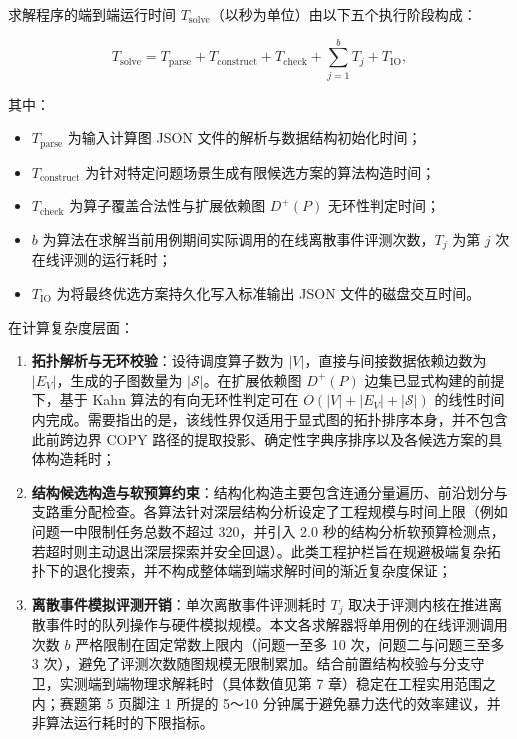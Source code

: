 \documentclass[anonymous,notoc]{gmcm2026}
\providecommand{\tightlist}{\setlength{\itemsep}{0pt}\setlength{\parskip}{0pt}}
\begin{document}
求解程序的端到端运行时间 \(T_{\mathrm{solve}}\)（以秒为单位）由以下五个执行阶段构成：

\begin{equation}
T_{\mathrm{solve}} = T_{\mathrm{parse}} + T_{\mathrm{construct}} + T_{\mathrm{check}} + \sum_{j=1}^{b} T_j + T_{\mathrm{IO}},
\end{equation}

其中：

\begin{itemize}
\tightlist
\item
  \(T_{\mathrm{parse}}\) 为输入计算图 JSON 文件的解析与数据结构初始化时间；
\item
  \(T_{\mathrm{construct}}\) 为针对特定问题场景生成有限候选方案的算法构造时间；
\item
  \(T_{\mathrm{check}}\) 为算子覆盖合法性与扩展依赖图 \(D^+(P)\) 无环性判定时间；
\item
  \(b\) 为算法在求解当前用例期间实际调用的在线离散事件评测次数，\(T_j\) 为第 \(j\) 次在线评测的运行耗时；
\item
  \(T_{\mathrm{IO}}\) 为将最终优选方案持久化写入标准输出 JSON 文件的磁盘交互时间。
\end{itemize}

在计算复杂度层面：

\begin{enumerate}
\def\labelenumi{\arabic{enumi}.}
\tightlist
\item
  \textbf{拓扑解析与无环校验}：设待调度算子数为 \(|V|\)，直接与间接数据依赖边数为 \(|E_V|\)，生成的子图数量为 \(|\mathcal{S}|\)。在扩展依赖图 \(D^+(P)\) 边集已显式构建的前提下，基于 Kahn 算法的有向无环性判定可在 \(O(|V| + |E_V| + |\mathcal{S}|)\) 的线性时间内完成。需要指出的是，该线性界仅适用于显式图的拓扑排序本身，并不包含此前跨边界 COPY 路径的提取投影、确定性字典序排序以及各候选方案的具体构造耗时；
\item
  \textbf{结构候选构造与软预算约束}：结构化构造主要包含连通分量遍历、前沿划分与支路重分配检查。各算法针对深层结构分析设定了工程规模与时间上限（例如问题一中限制任务总数不超过 320，并引入 2.0 秒的结构分析软预算检测点，若超时则主动退出深层探索并安全回退）。此类工程护栏旨在规避极端复杂拓扑下的退化搜索，并不构成整体端到端求解时间的渐近复杂度保证；
\item
  \textbf{离散事件模拟评测开销}：单次离散事件评测耗时 \(T_j\) 取决于评测内核在推进离散事件时的队列操作与硬件模拟规模。本文各求解器将单用例的在线评测调用次数 \(b\) 严格限制在固定常数上限内（问题一至多 10 次，问题二与问题三至多 3 次），避免了评测次数随图规模无限制累加。结合前置结构校验与分支守卫，实测端到端物理求解耗时（具体数值见第 7 章）稳定在工程实用范围之内；赛题第 5 页脚注 1 所提的 5～10 分钟属于避免暴力迭代的效率建议，并非算法运行耗时的下限指标。
\end{enumerate}
\end{document}
